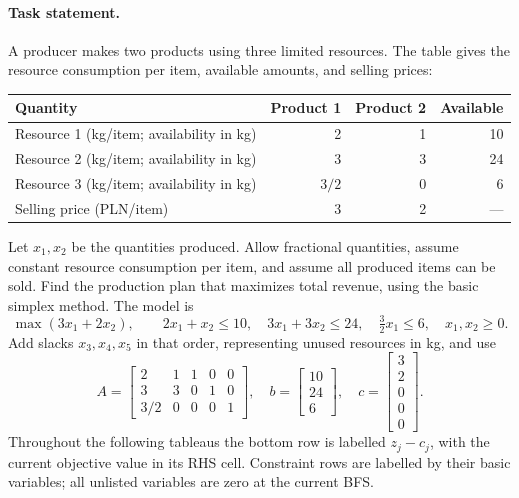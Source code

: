 \documentclass[11pt,a4paper]{article}
\begin{document}
\paragraph{Task statement.}
A producer makes two products using three limited resources. The table gives
the resource consumption per item, available amounts, and selling prices:
\begin{center}
  \begin{tabular}{lrrr}\toprule
    Quantity & Product 1 & Product 2 & Available\\\midrule
    Resource 1 (kg/item; availability in kg) & 2 & 1 & 10\\
    Resource 2 (kg/item; availability in kg) & 3 & 3 & 24\\
    Resource 3 (kg/item; availability in kg) & $3/2$ & 0 & 6\\
    Selling price (PLN/item) & 3 & 2 & ---\\\bottomrule
  \end{tabular}
\end{center}
Let $x_1,x_2$ be the quantities produced. Allow fractional quantities, assume
constant resource consumption per item, and assume all produced items can be
sold. Find the production plan that maximizes total revenue, using the basic
simplex method. The model is
\[
  \max(3x_1+2x_2),\qquad
  2x_1+x_2\leq10,\quad 3x_1+3x_2\leq24,\quad
  \tfrac32x_1\leq6,\quad x_1,x_2\geq0.
\]
Add slacks $x_3,x_4,x_5$ in that order, representing unused resources in kg,
and use
\[
  A=\begin{bmatrix}2&1&1&0&0\\3&3&0&1&0\\3/2&0&0&0&1\end{bmatrix},
  \quad b=\begin{bmatrix}10\\24\\6\end{bmatrix},\quad
  c=\begin{bmatrix}3\\2\\0\\0\\0\end{bmatrix}.
\]
Throughout the following tableaus the bottom row is labelled $z_j-c_j$,
with the current objective value in its RHS cell. Constraint rows are labelled by their
basic variables; all unlisted variables are zero at the current BFS.
\end{document}

